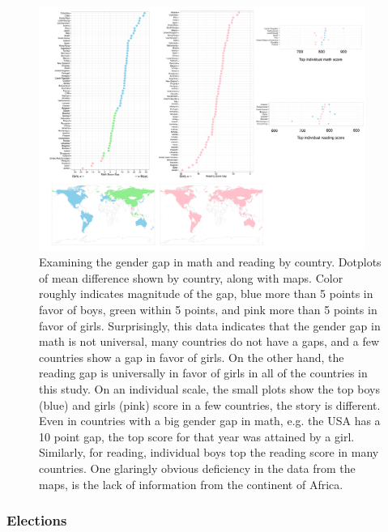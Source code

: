 \documentclass{article}
\begin{document}
\begin{figure}[tp]
\centerline{\includegraphics[width=0.95\textwidth]{images/PISA.pdf}}
\caption{Examining the gender gap in math and reading by country. Dotplots of mean difference shown by country, along with maps. Color roughly indicates magnitude of the gap, blue more than 5 points in favor of boys, green within 5 points, and pink more than 5 points in favor of girls. Surprisingly, this data indicates that the gender gap in math is not universal, many countries do not have a gaps, and a few countries show a gap in favor of girls. On the other hand, the reading gap is universally in favor of girls in all of the countries in this study. On an individual scale, the small plots show the top boys (blue) and girls (pink) score in a few countries, the story is different. Even in countries with a big gender gap in math, e.g. the USA has a 10 point gap, the top score for that year was attained by a girl. Similarly, for reading, individual boys top the reading score in many countries. One glaringly obvious deficiency in the data from the maps, is the lack of information from the continent of Africa.}
\label{OECD-gender}
\end{figure}


\subsubsection{Elections}
\end{document}
